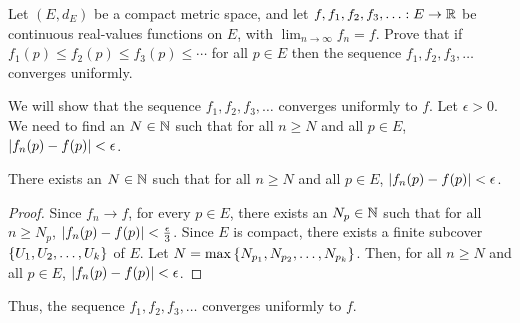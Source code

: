 \begin{problem}
  Let $(E, d_E)$ be a compact metric space, and
  let $f, f_1, f_2, f_3, \ldots : E \to \mathbb{R}$ be continuous real-values functions on $E$,
  with $\displaystyle \lim_{n \to \infty} f_n = f$.
  Prove that if $f_1(p) \leq f_2(p) \leq f_3(p) \leq \cdots$ for all $p \in E$
  then the sequence $f_1, f_2, f_3, \ldots$ converges uniformly.
\end{problem}

\begin{answer}
  We will show that the sequence $f_1, f_2, f_3, \ldots$ converges uniformly to $f$.
  Let $\epsilon > 0$.
  We need to find an $N \in \mathbb{N}$ such that for all $n \geq N$ and all $p \in E$,
  $\lvert f_n(p) - f(p)\rvert < \epsilon$.

  \begin{claim}
    There exists an $N \in \mathbb{N}$ such that for all $n \geq N$ and all $p \in E$,
    $\lvert f_n(p) - f(p)\rvert < \epsilon$.
    \begin{proof}
      Since $f_n \to f$, for every $p \in E$, there exists an $N_p \in \mathbb{N}$
      such that for all $n \geq N_p$, $\lvert f_n(p) - f(p)\rvert < \frac{\epsilon}{3}$.
      Since $E$ is compact, there exists a finite subcover $\left\{U_1, U_2, \ldots, U_k\right\}$
      of $E$.
      Let $N = \max \left\{N_{p_1}, N_{p_2}, \ldots, N_{p_k}\right\}$.
      Then, for all $n \geq N$ and all $p \in E$, $\lvert f_n(p) - f(p)\rvert < \epsilon$.
    \end{proof}
  \end{claim}
  Thus, the sequence $f_1, f_2, f_3, \ldots$ converges uniformly to $f$.
\end{answer}
